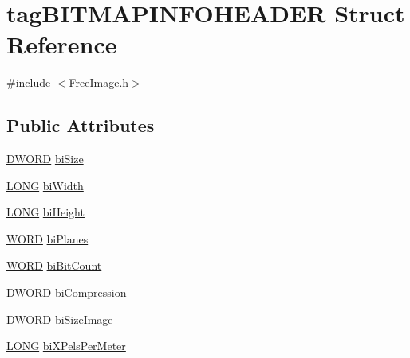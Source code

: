\hypertarget{structtag_b_i_t_m_a_p_i_n_f_o_h_e_a_d_e_r}{\section{tag\-B\-I\-T\-M\-A\-P\-I\-N\-F\-O\-H\-E\-A\-D\-E\-R Struct Reference}
\label{structtag_b_i_t_m_a_p_i_n_f_o_h_e_a_d_e_r}
}


{\ttfamily \#include $<$Free\-Image.\-h$>$}

\subsection*{Public Attributes}
\begin{DoxyCompactItemize}
\item 
\hyperlink{_free_image_8h_af483253b2143078cede883fc3c111ad2}{D\-W\-O\-R\-D} \hyperlink{structtag_b_i_t_m_a_p_i_n_f_o_h_e_a_d_e_r_a78b47f256953606cbf23cd665452a263}{bi\-Size}
\item 
\hyperlink{_free_image_8h_a27ec6163192f1e1e72d87421379ea3d4}{L\-O\-N\-G} \hyperlink{structtag_b_i_t_m_a_p_i_n_f_o_h_e_a_d_e_r_a4bbc605184be98c4da36f707f7695e0f}{bi\-Width}
\item 
\hyperlink{_free_image_8h_a27ec6163192f1e1e72d87421379ea3d4}{L\-O\-N\-G} \hyperlink{structtag_b_i_t_m_a_p_i_n_f_o_h_e_a_d_e_r_aa18cf290b7f7a6d1cc8058feae85ab68}{bi\-Height}
\item 
\hyperlink{_free_image_8h_ab24077addd3b7b13e086987ff296552c}{W\-O\-R\-D} \hyperlink{structtag_b_i_t_m_a_p_i_n_f_o_h_e_a_d_e_r_a261e0f0a578bcd4d53a4a221e6ebe2fa}{bi\-Planes}
\item 
\hyperlink{_free_image_8h_ab24077addd3b7b13e086987ff296552c}{W\-O\-R\-D} \hyperlink{structtag_b_i_t_m_a_p_i_n_f_o_h_e_a_d_e_r_a713c58f9cf7d5f115938d189d59fadf5}{bi\-Bit\-Count}
\item 
\hyperlink{_free_image_8h_af483253b2143078cede883fc3c111ad2}{D\-W\-O\-R\-D} \hyperlink{structtag_b_i_t_m_a_p_i_n_f_o_h_e_a_d_e_r_a6b50d93eae77d44af8907740e337583d}{bi\-Compression}
\item 
\hyperlink{_free_image_8h_af483253b2143078cede883fc3c111ad2}{D\-W\-O\-R\-D} \hyperlink{structtag_b_i_t_m_a_p_i_n_f_o_h_e_a_d_e_r_ac69dfda61a32d8ec53dd11ef165d198b}{bi\-Size\-Image}
\item 
\hyperlink{_free_image_8h_a27ec6163192f1e1e72d87421379ea3d4}{L\-O\-N\-G} \hyperlink{structtag_b_i_t_m_a_p_i_n_f_o_h_e_a_d_e_r_ae363738b6e92248a7be41f4e7ed55c54}{bi\-X\-Pels\-Per\-Meter}

\end{DoxyCompactItemize}
